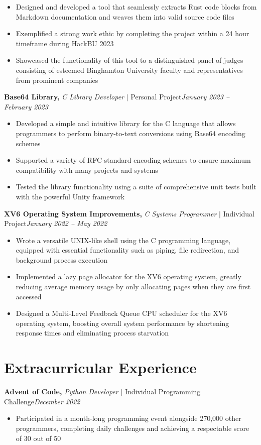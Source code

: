 \documentclass[8pt]{extarticle}
\newcommand{\jobentry}[4]{\textbf{#1,} \textit{#2} \(|\) #3\hfill \textit{#4}}
\begin{document}
\begin{itemize}
  \item{Designed and developed a tool that seamlessly extracts Rust code blocks from Markdown documentation and weaves them into valid source code files}
  \item{Exemplified a strong work ethic by completing the project within a 24 hour timeframe during HackBU 2023}
  \item{Showcased the functionality of this tool to a distinguished panel of judges consisting of esteemed Binghamton University faculty and representatives from prominent companies}
\end{itemize}

\jobentry{Base64 Library}{C Library Developer}{Personal Project}{January 2023 -- February 2023}

\begin{itemize}
  \item{Developed a simple and intuitive library for the C language that allows programmers to perform binary-to-text conversions using Base64 encoding schemes}
  \item{Supported a variety of RFC-standard encoding schemes to ensure maximum compatibility with many projects and systems}
  \item{Tested the library functionality using a suite of comprehensive unit tests built with the powerful Unity framework}
\end{itemize}

\jobentry{XV6 Operating System Improvements}{C Systems Programmer}{Individual Project}{January 2022 -- May 2022}

\begin{itemize}
  \item{Wrote a versatile UNIX-like shell using the C programming language, equipped with essential functionality such as piping, file redirection, and background process execution}
  \item{Implemented a lazy page allocator for the XV6 operating system, greatly reducing average memory usage by only allocating pages when they are first accessed}
  \item{Designed a Multi-Level Feedback Queue CPU scheduler for the XV6 operating system, boosting overall system performance by shortening response times and eliminating process starvation}
\end{itemize}

\section{Extracurricular Experience}

\jobentry{Advent of Code}{Python Developer}{Individual Programming Challenge}{December 2022}
\begin{itemize}
  \item{Participated in a month-long programming event alongside 270,000 other programmers, completing daily challenges and achieving a respectable score of 30 out of 50}
\end{itemize}
\end{document}

